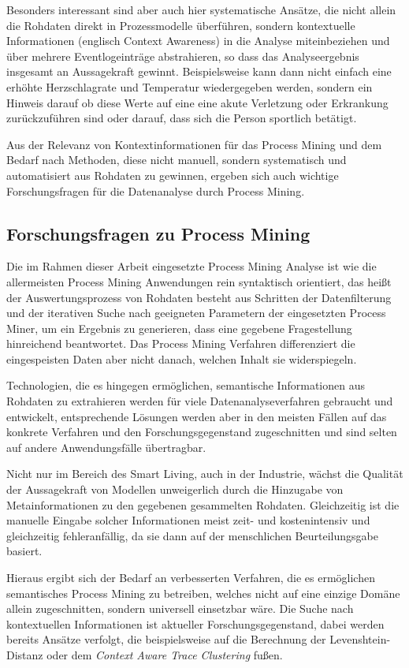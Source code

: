 Besonders interessant sind aber auch hier systematische Ansätze, die nicht allein die Rohdaten direkt in Prozessmodelle überführen, sondern kontextuelle Informationen (englisch Context Awareness) in die Analyse miteinbeziehen und über mehrere Eventlogeinträge abstrahieren, so dass das Analyseergebnis insgesamt an Aussagekraft gewinnt.
Beispielsweise kann dann nicht einfach eine erhöhte Herzschlagrate und Temperatur wiedergegeben werden, sondern ein Hinweis darauf ob diese Werte auf eine eine akute Verletzung oder Erkrankung zurückzuführen sind oder darauf, dass sich die Person sportlich betätigt. 

Aus der Relevanz von Kontextinformationen für das Process Mining und dem Bedarf nach Methoden, diese nicht manuell, sondern systematisch und automatisiert aus Rohdaten zu gewinnen, ergeben sich auch wichtige Forschungsfragen für die Datenanalyse durch Process Mining.

\subsection{Forschungsfragen zu Process Mining}
Die im Rahmen dieser Arbeit eingesetzte Process Mining Analyse ist wie die allermeisten Process Mining Anwendungen rein syntaktisch orientiert, das heißt der Auswertungsprozess von Rohdaten besteht aus Schritten der Datenfilterung und der iterativen Suche nach geeigneten Parametern der eingesetzten Process Miner, um ein Ergebnis zu generieren, dass eine gegebene Fragestellung hinreichend beantwortet. Das Process Mining Verfahren differenziert die eingespeisten Daten aber nicht danach, welchen Inhalt sie widerspiegeln. 

Technologien, die es hingegen ermöglichen, semantische Informationen aus Rohdaten zu extrahieren werden für viele Datenanalyseverfahren gebraucht und entwickelt, entsprechende Lösungen werden aber in den meisten Fällen auf das konkrete Verfahren und den Forschungsgegenstand zugeschnitten und sind selten auf andere Anwendungsfälle übertragbar. 

Nicht nur im Bereich des Smart Living, auch in der Industrie, wächst die Qualität der Aussagekraft von Modellen unweigerlich durch die Hinzugabe von Metainformationen zu den gegebenen gesammelten Rohdaten. Gleichzeitig ist die manuelle Eingabe solcher Informationen meist zeit- und kostenintensiv und gleichzeitig fehleranfällig, da sie dann auf der menschlichen Beurteilungsgabe basiert.

Hieraus ergibt sich der Bedarf an verbesserten Verfahren, die es ermöglichen semantisches Process Mining zu betreiben, welches nicht auf eine einzige Domäne allein zugeschnitten, sondern universell einsetzbar wäre. Die Suche nach kontextuellen Informationen ist aktueller Forschungsgegenstand, dabei werden bereits Ansätze verfolgt, die beispielsweise auf die Berechnung der Levenshtein-Distanz oder dem \textit{  Context Aware Trace Clustering} fußen.




